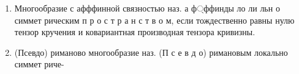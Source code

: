 \documentclass[10pt]{article}
\begin{document}
\begin{enumerate}

  \item Многообразие с афффинной связностью наз. а ф্ффинды ло ли льн о симмет рическим п р о с т р а н с т в о м, если тождественно равны нулю тензор кручения и ковариантная производная тензора кривизны.



  \item (Псевдо) риманово многообразие наз. (П с е в д о) римановым локально симмет риче-



\end{enumerate}
\end{document}
